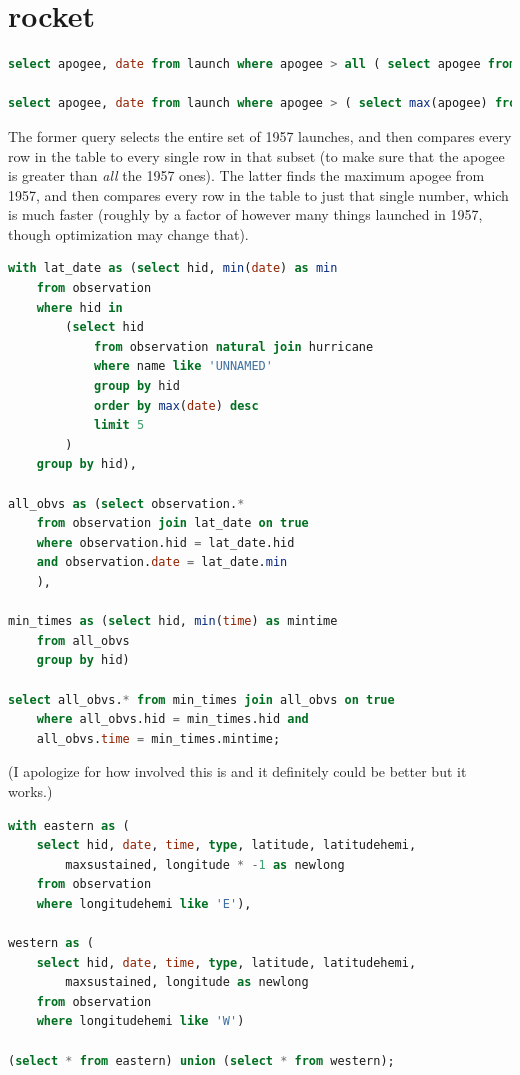 \documentclass[11pt, oneside]{amsart}   	%
\begin{document}
\section{rocket}

\begin{lstlisting}[language=SQL]
select apogee, date from launch where apogee > all ( select apogee from launch where date_part('year', date)=1957);

select apogee, date from launch where apogee > ( select max(apogee) from launch where date_part('year', date)=1957);
\end{lstlisting}
            
The former query selects the entire set of 1957 launches, and then compares every row in the table to every single row in that subset (to make sure that the apogee is greater than \textit{all} the 1957 ones). The latter finds the maximum apogee from 1957, and then compares every row in the table to just that single number, which is much faster (roughly by a factor of however many things launched in 1957, though optimization may change that). 


\begin{lstlisting}[language=SQL]
with lat_date as (select hid, min(date) as min
    from observation 
    where hid in 
        (select hid
            from observation natural join hurricane
            where name like 'UNNAMED'
            group by hid
            order by max(date) desc
            limit 5
        )
    group by hid),

all_obvs as (select observation.*
    from observation join lat_date on true 
    where observation.hid = lat_date.hid
    and observation.date = lat_date.min
    ),

min_times as (select hid, min(time) as mintime
    from all_obvs
    group by hid)

select all_obvs.* from min_times join all_obvs on true 
    where all_obvs.hid = min_times.hid and
    all_obvs.time = min_times.mintime;
\end{lstlisting}
(I apologize for how involved this is and it definitely could be better but it works.)


\begin{lstlisting}[language=SQL]
with eastern as (
    select hid, date, time, type, latitude, latitudehemi, 
        maxsustained, longitude * -1 as newlong
    from observation
    where longitudehemi like 'E'),

western as (
    select hid, date, time, type, latitude, latitudehemi, 
        maxsustained, longitude as newlong
    from observation
    where longitudehemi like 'W')
    
(select * from eastern) union (select * from western);
\end{lstlisting}
\end{document}
